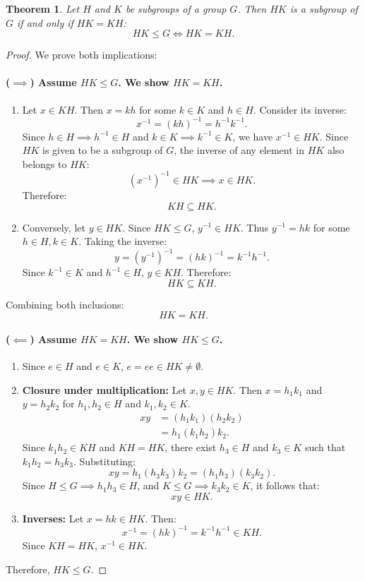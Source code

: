 \documentclass[12pt]{article}
\theoremstyle{definition}
\theoremstyle{plain}
\newtheorem{theorem}{Theorem}[section]
\begin{document}
\begin{theorem}
Let $H$ and $K$ be subgroups of a group $G$. Then $HK$ is a subgroup of $G$ if and only if $HK = KH$:
\[
HK \le G \iff HK = KH.
\]
\end{theorem}

\begin{proof}
We prove both implications:

\paragraph{($\implies$) Assume $HK \le G$. We show $HK = KH$.}
\begin{enumerate}
    \item Let $x \in KH$. Then $x = kh$ for some $k \in K$ and $h \in H$.
    Consider its inverse:
    \[
    x^{-1} = (kh)^{-1} = h^{-1} k^{-1}.
    \]
    Since $h \in H \implies h^{-1} \in H$ and $k \in K \implies k^{-1} \in K$, we have $x^{-1} \in HK$.
    Since $HK$ is given to be a subgroup of $G$, the inverse of any element in $HK$ also belongs to $HK$:
    \[
    (x^{-1})^{-1} \in HK \implies x \in HK.
    \]
    Therefore:
    \[
    KH \subseteq HK.
    \]
    
    \item Conversely, let $y \in HK$.
    Since $HK \le G$, $y^{-1} \in HK$.
    Thus $y^{-1} = hk$ for some $h \in H, k \in K$.
    Taking the inverse:
    \[
    y = (y^{-1})^{-1} = (hk)^{-1} = k^{-1} h^{-1}.
    \]
    Since $k^{-1} \in K$ and $h^{-1} \in H$, $y \in KH$.
    Therefore:
    \[
    HK \subseteq KH.
    \]
\end{enumerate}
Combining both inclusions:
\[
HK = KH.
\]

\paragraph{($\impliedby$) Assume $HK = KH$. We show $HK \le G$.}
\begin{enumerate}
    \item Since $e \in H$ and $e \in K$, $e = ee \in HK \neq \emptyset$.
    \item \textbf{Closure under multiplication:}
    Let $x, y \in HK$. Then $x = h_1 k_1$ and $y = h_2 k_2$ for $h_1, h_2 \in H$ and $k_1, k_2 \in K$.
    \begin{align*}
    xy &= (h_1 k_1)(h_2 k_2) \\
    &= h_1 (k_1 h_2) k_2.
    \end{align*}
    Since $k_1 h_2 \in KH$ and $KH = HK$, there exist $h_3 \in H$ and $k_3 \in K$ such that $k_1 h_2 = h_3 k_3$.
    Substituting:
    \[
    xy = h_1 (h_3 k_3) k_2 = (h_1 h_3)(k_3 k_2).
    \]
    Since $H \le G \implies h_1 h_3 \in H$, and $K \le G \implies k_3 k_2 \in K$, it follows that:
    \[
    xy \in HK.
    \]
    \item \textbf{Inverses:}
    Let $x = hk \in HK$. Then:
    \[
    x^{-1} = (hk)^{-1} = k^{-1} h^{-1} \in KH.
    \]
    Since $KH = HK$, $x^{-1} \in HK$.
\end{enumerate}
Therefore, $HK \le G$.
\end{proof}
\end{document}
